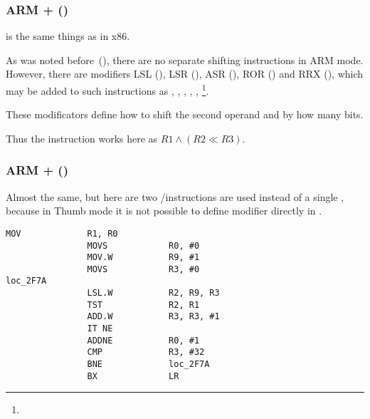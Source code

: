 \subsubsection{ARM + \OptimizingXcodeIV (\ARMMode)}



\TST is the same things as \TEST in x86.

As was noted before~(),
there are no separate shifting instructions in ARM mode.
However, there are modifiers 
LSL (), 
LSR (), 
ASR (), 
ROR () and
RRX (), which may be added to such instructions as \MOV, \TST,
\CMP, \ADD, \SUB, \RSB\footnote{\DataProcessingInstructionsFootNote}.

These modificators define how to shift the second operand and by how many bits.

Thus the  instruction works here as $R1 \land (R2 \ll R3)$.

\subsubsection{ARM + \OptimizingXcodeIV (\ThumbTwoMode)}

Almost the same, but here are two /\TST instructions are used instead of a single \TST, because in Thumb mode it is not
possible to define \LSL modifier directly in \TST.

\begin{lstlisting}[label=ARM_leaf_example5]
                MOV             R1, R0
                MOVS            R0, #0
                MOV.W           R9, #1
                MOVS            R3, #0
loc_2F7A
                LSL.W           R2, R9, R3
                TST             R2, R1
                ADD.W           R3, R3, #1
                IT NE
                ADDNE           R0, #1
                CMP             R3, #32
                BNE             loc_2F7A
                BX              LR
\end{lstlisting}


